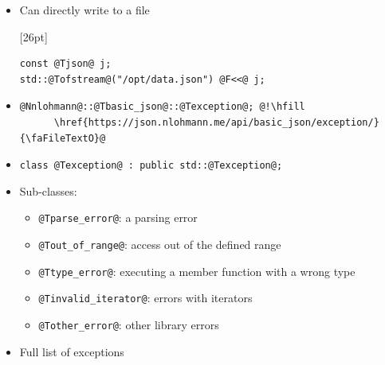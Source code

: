 \documentclass{slides}
\makeatletter
\newcommand{\@slidetitle}{}
\newcommand{\slidetitle}[1]{\renewcommand{\@slidetitle}{#1}}
\makeatother
\begin{document}
\begin{itemize}
  \item Can directly write to a file
    \begin{tcolorbox}{\F{16pt}[26pt]
    \begin{lstlisting}
const @Tjson@ j;
std::@Tofstream@("/opt/data.json") @F<<@ j;
    \end{lstlisting}
    }\end{tcolorbox}
\end{itemize}

\pagebreak
\slidetitle{Exceptions}

\begin{itemize}
  \item \begin{lstlisting}
@Nnlohmann@::@Tbasic_json@::@Texception@; @!\hfill
      \href{https://json.nlohmann.me/api/basic_json/exception/}{\faFileTextO}@
    \end{lstlisting}
  \item \lstinline{class @Texception@ : public std::@Texception@;}
  \item Sub-classes:
    \begin{itemize}
      \item \lstinline{@Tparse_error@}:
        a parsing error
      \item \lstinline{@Tout_of_range@}:
        access out of the defined range
      \item \lstinline{@Ttype_error@}:
        executing a member function with a wrong type
      \item \lstinline{@Tinvalid_iterator@}:
        errors with iterators
      \item \lstinline{@Tother_error@}:
        other library errors
    \end{itemize}
  \item Full list of exceptions \hfill
    \href{https://json.nlohmann.me/home/exceptions/}{\faFileTextO}
\end{itemize}

\pagebreak
\slidetitle{\faHandORight\,\ Best practice: Use exceptions}
\end{document}
